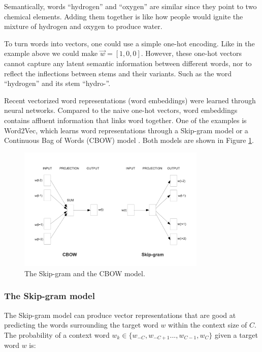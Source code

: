 \documentclass[thesis,fonts=libertine]{cluu}
\begin{document}
Semantically, words ``hydrogen'' and ``oxygen'' are similar since they point to two chemical elements. Adding them together is like how people would ignite the mixture of hydrogen and oxygen to produce water.

To turn words into vectors, one could use a simple one-hot encoding. Like in the example above we could make $\vec{w}=[1, 0, 0]$. However, these one-hot vectors cannot capture any latent semantic information between different words, nor to reflect the inflections between stems and their variants. Such as the  word ``hydrogen'' and its stem ``hydro-''.

Recent vectorized word representations (word embeddings) were learned through neural networks.  Compared to the naive one-hot vectors, word embeddings contains affluent information that links word together. One of the examples is Word2Vec, which learns word representations through a Skip-gram model or a Continuous Bag of Words (CBOW) model \parencite{Mikolov:2013ab}. Both models are shown in Figure \ref{fig:skip_gram_and_cbow}.

\begin{figure}
  \centering
  \includegraphics[width=0.8\textwidth]{skip_gram_and_cbow_models.png}
  \caption{The Skip-gram and the CBOW model. \parencite{Mikolov:2013ac}}
  \label{fig:skip_gram_and_cbow}
\end{figure}

\subsubsection{The Skip-gram model}
The Skip-gram model can produce vector representations that are good at predicting the words surrounding the target word $w$ within the context size of $C$. The probability of a context word $w_k \in \{w_{-C}, w_{-C+1} ..., w_{C-1}, w_C\}$ given a target word $w$ is:
\end{document}
